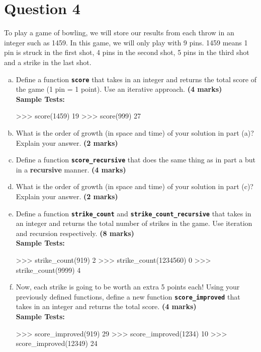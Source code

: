 \section{Question 4}
To play a game of bowling, we will store our results from each throw in an integer such
as 1459. In this game, we will only play with 9 pins. 1459 means 1 pin is struck in the
first shot, 4 pins in the second shot, 5 pins in the third shot and a strike in the last shot.
\begin{enumerate}[(a)]
\item Define a function \texttt{\bfseries score} that takes in an integer and returns the total score of the
game (1 pin = 1 point). Use an iterative approach. \textbf{(4 marks)} \\
\textbf{Sample Tests:}
\begin{python}
>>> score(1459)
19
>>> score(999)
27
\end{python}

\item What is the order of growth (in space and time) of your solution in part (a)? Explain
your answer. \textbf{(2 marks)}

\item Define a function \texttt{\bfseries score\_recursive} that does the same thing as in part a but in a
\textbf{recursive} manner. \textbf{(4 marks)}

\item What is the order of growth (in space and time) of your solution in part (c)? Explain
your answer. \textbf{(2 marks)}

\item Define a function \texttt{\bfseries strike\_count} and \texttt{\bfseries strike\_count\_recursive} that takes in
an integer and returns the total number of strikes in the game. Use iteration and recursion respectively. \textbf{(8 marks)} \\
\textbf{Sample Tests:}
\begin{python}
>>> strike_count(919)
2
>>> strike_count(1234560)
0
>>> strike_count(9999)
4
\end{python}

\item Now, each strike is going to be worth an extra 5 points each! Using your previously
defined functions, define a new function \texttt{\bfseries score\_improved} that takes in an integer and
returns the total score. \textbf{(4 marks)} \\
\textbf{Sample Tests:}
\begin{python}
>>> score_improved(919)
29
>>> score_improved(1234)
10
>>> score_improved(12349)
24
\end{python}
\end{enumerate}

